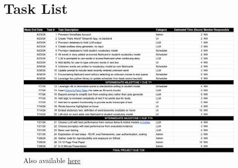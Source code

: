 \documentclass[
	letterpaper, %
]{jdf}
\begin{document}
\section{Task List}

\begin{figure}[H]
    \centering
    \includegraphics[width=0.9\linewidth]{Project Proposal/project_plan.png}
    \caption{Also available \href{https://docs.google.com/spreadsheets/d/10IeplrSFJeub_BLcY34Mex57YlT-x3DftFnladG2l4g/edit?usp=sharing}{here}}
    \label{Task List}
\end{figure}

\printbibliography{}
\end{document}
